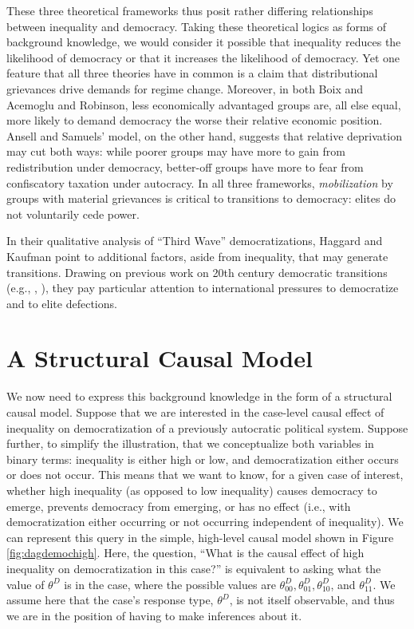 \documentclass[12pt,]{book}
\begin{document}
These three theoretical frameworks thus posit rather differing relationships between inequality and democracy. Taking these theoretical logics as forms of background knowledge, we would consider it possible that inequality reduces the likelihood of democracy or that it increases the likelihood of democracy. Yet one feature that all three theories have in common is a claim that distributional grievances drive demands for regime change. Moreover, in both Boix and Acemoglu and Robinson, less economically advantaged groups are, all else equal, more likely to demand democracy the worse their relative economic position. Ansell and Samuels' model, on the other hand, suggests that relative deprivation may cut both ways: while poorer groups may have more to gain from redistribution under democracy, better-off groups have more to fear from confiscatory taxation under autocracy. In all three frameworks, \emph{mobilization} by groups with material grievances is critical to transitions to democracy: elites do not voluntarily cede power.

In their qualitative analysis of ``Third Wave'' democratizations, Haggard and Kaufman point to additional factors, aside from inequality, that may generate transitions. Drawing on previous work on 20th century democratic transitions (e.g., \citet{huntington1993third}, \citet{linz1996problems}), they pay particular attention to international pressures to democratize and to elite defections.

\hypertarget{a-structural-causal-model}{%
\section{A Structural Causal Model}\label{a-structural-causal-model}}

We now need to express this background knowledge in the form of a structural causal model. Suppose that we are interested in the case-level causal effect of inequality on democratization of a previously autocratic political system. Suppose further, to simplify the illustration, that we conceptualize both variables in binary terms: inequality is either high or low, and democratization either occurs or does not occur. This means that we want to know, for a given case of interest, whether high inequality (as opposed to low inequality) causes democracy to emerge, prevents democracy from emerging, or has no effect (i.e., with democratization either occurring or not occurring independent of inequality). We can represent this query in the simple, high-level causal model shown in Figure \ref{fig:dagdemochigh}. Here, the question, ``What is the causal effect of high inequality on democratization in this case?'' is equivalent to asking what the value of \(\theta^D\) is in the case, where the possible values are \(\theta_{00}^D, \theta_{01}^D, \theta_{10}^D\), and \(\theta_{11}^D\). We assume here that the case's response type, \(\theta^D\), is not itself observable, and thus we are in the position of having to make inferences about it.
\end{document}
